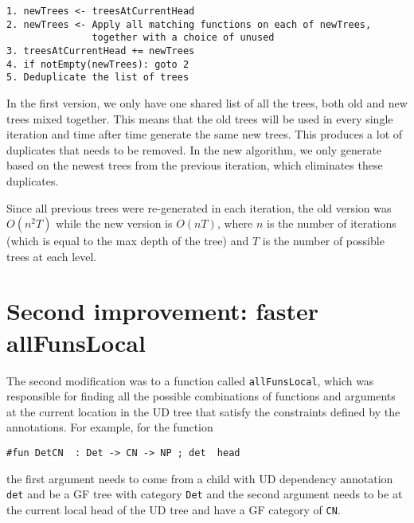 \begin{verbatim}
1. newTrees <- treesAtCurrentHead
2. newTrees <- Apply all matching functions on each of newTrees, 
               together with a choice of unused 
3. treesAtCurrentHead += newTrees
4. if notEmpty(newTrees): goto 2
5. Deduplicate the list of trees
\end{verbatim}

In the first version, we only have one shared list of all the trees, both old and new trees mixed together. This means that the old trees will be used in every single iteration and time after time generate the same new trees. This produces a lot of duplicates that needs to be removed. In the new algorithm, we only generate based on the newest trees from the previous iteration, which eliminates these duplicates.

Since all previous trees were re-generated in each iteration, the old version was $O(n^2T)$ while the new version is $O(nT)$, where $n$ is the number of iterations (which is equal to the max depth of the tree) and $T$ is the number of possible trees at each level.



\section{Second improvement: faster allFunsLocal} \label{sect:allFunsLocal}

The second modification was to a function called \texttt{allFunsLocal}, which was responsible for finding all the possible combinations of functions and arguments at the current location in the UD tree that satisfy the constraints defined by the annotations. For example, for the function

\begin{verbatim}
#fun DetCN  : Det -> CN -> NP ; det  head
\end{verbatim}

the first argument needs to come from a child with UD dependency annotation \texttt{det} and be a GF tree with category \texttt{Det} and the second argument needs to be at the current local head of the UD tree and have a GF category of \texttt{CN}.

